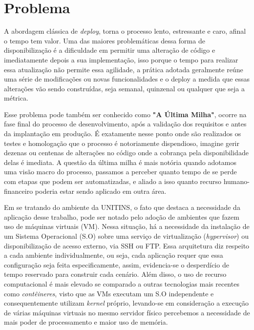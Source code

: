 \chapter{Problema}\label{cap:problema}

A abordagem clássica de \textit{deploy}, torna o processo lento, estressante e caro, afinal o tempo tem valor. Uma das maiores problemáticas dessa forma de disponibilização é a dificuldade em permitir uma alteração de código e imediatamente depois a sua implementação, isso porque o tempo para realizar essa atualização não permite essa agilidade, a prática adotada geralmente reúne uma série de modificações ou novas funcionalidades e o deploy a medida que essas alterações vão sendo construídas, seja semanal, quinzenal ou qualquer que seja a métrica.

Esse problema pode também ser conhecido como \textbf{"A Última Milha"}, ocorre na fase final do processo de desenvolvimento, após a validação dos requisitos e antes da implantação em produção. É exatamente nesse ponto onde são realizados os testes e homologação que o processo é notoriamente dispendioso, imagine gerir dezenas ou centenas de alterações no código onde a cobrança pela disponibilidade delas é imediata. A questão da última milha é mais notória quando adotamos uma visão macro do processo, passamos a perceber quanto tempo de se perde com etapas que podem ser automatizadas, e aliado a isso quanto recurso humano-financeiro poderia estar sendo aplicado em outra área. \cite{sato2014devops}

Em se tratando do ambiente da UNITINS, o fato que destaca a necessidade da aplicação desse trabalho, pode ser notado pelo adoção de ambientes que fazem uso de máquinas virtuais (VM). Nessa situação, há a necessidade da instalação de um Sistema Operacional (S.O) sobre uma serviço de virtualização (\textit{hypervisor}) ou disponibilização de acesso externo, via SSH ou FTP. Essa arquitetura diz respeito a cada ambiente individualmente, ou seja, cada aplicação requer que essa configuração seja feita especificamente, assim, evidencia-se o desperdício de tempo reservado para construir cada cenário. Além disso, o uso de recurso computacional é mais elevado se comparado a outras tecnologias mais recentes como \textit{contêineres}, visto que as VMs executam um S.O independente e consequentemente utilizam \textit{kernel} próprio, levando-se em consideração a execução de várias máquinas virtuais no mesmo servidor físico percebemos a necessidade de mais poder de processamento e maior uso de memória.\cite{laureano2006maquinas}